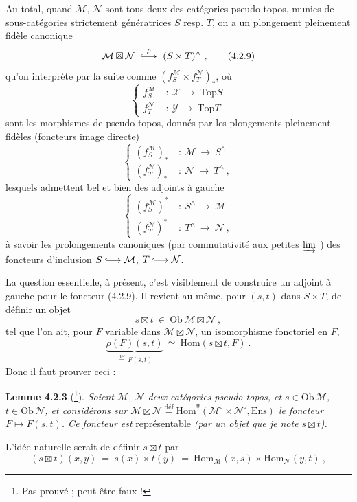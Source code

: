 \documentclass[11pt]{article}
\newcommand{\printedpage}[1]{\marginpar{\footnotesize p.~#1}}
\newcommand{\msp}[1]{\marginpar{\footnotesize [#1]}}
\newcommand{\cM}{\mathcal{M}}
\newcommand{\cN}{\mathcal{N}}
\newcommand{\cX}{\mathcal{X}}
\newcommand{\cY}{\mathcal{Y}}
\newcommand{\uHom}{\underline{\mathrm{Hom}}}
\newcommand{\Hom}{\mathrm{Hom}}
\newcommand{\Ens}{\mathrm{Ens}}
\newcommand{\Top}{\mathrm{Top}}
\newcommand{\Ob}{\mathrm{Ob}\,}
\newcommand{\defeq}{\overset{\text{déf}}{=}}
\newcommand{\bt}{\boxtimes}
\newcommand{\linj}{\lhook\joinrel\longrightarrow}
\begin{document}
Au total, quand $\cM$, $\cN$ sont tous deux des catégories pseudo-topos, munies de sous-catégories strictement génératrices $S$ resp. $T$, on a un plongement pleinement fidèle canonique
\[
\cM\bt\cN \ \overset{\rho}{\linj}\ (S\times T)^{\wedge} \ ,
\tag*{(4.2.9)}
\]
\printedpage{7}
qu'on interprète par la suite comme $(f_{S}^{\cM}\times f_{T}^{\cN})_{*}$, où
\[
\left\{
\begin{aligned}
f_{S}^{\cM} \ &:\ \cX \ \longrightarrow\ \Top S\\
f_{T}^{\cN} \ &:\ \cY \ \longrightarrow\ \Top T
\end{aligned}
\right.
\tag*{(4.2.10)}
\]
sont les morphismes de pseudo-topos, donnés par les plongements pleinement fidèles (foncteurs image directe)
\[
\left\{
\begin{aligned}
(f_{S}^{\cM})_{*} \ &:\ \cM \ \longrightarrow\ S^{\wedge}\\
(f_{T}^{\cN})_{*} \ &:\ \cN \ \longrightarrow\ T^{\wedge} \ ,
\end{aligned}
\right.
\tag*{(4.2.11)}
\]
lesquels admettent bel et bien des adjoints à gauche
\msp{page 63}
\[
\left\{
\begin{aligned}
(f_{S}^{\cM})^{*} \ &:\ S^{\wedge} \ \longrightarrow\ \cM\\
(f_{T}^{\cN})^{*} \ &:\ T^{\wedge} \ \longrightarrow\ \cN \ ,
\end{aligned}
\right.
\tag*{(4.2.12)}
\]
à savoir les prolongements canoniques (par commutativité aux petites $\varinjlim$ ) des foncteurs d'inclusion $S \linj \cM$, $T \linj \cN$.

La question essentielle, à présent, c'est visiblement de construire un adjoint à gauche pour le foncteur (4.2.9). Il revient au même, pour $(s,t)$ dans $S\times T$, de définir un objet
\[
s\bt t \ \in\ \Ob\cM\bt\cN \ ,
\tag*{(4.2.13)}
\]
tel que l'on ait, pour $F$ variable dans $\cM\bt\cN$, un isomorphisme fonctoriel en $F$,
\[
\underbrace{\rho(F)(s,t)}_{\defeq\, F(s,t)} \ \simeq\ \Hom(s\bt t,F) \ .
\]
Donc il faut prouver ceci :

\textbf{Lemme 4.2.3} (\footnote[4]{Pas prouvé ; peut-être faux !}). \textit{Soient $\cM$, $\cN$ deux catégories pseudo-topos, et $s\in\Ob\cM$, $t\in\Ob\cN$, et considérons sur $\cM\bt\cN\defeq\uHom^{!!}(\cM^{\circ}\times\cN^{\circ},\Ens)$ le foncteur $F\longmapsto F(s,t)$. Ce foncteur est} représentable \textit{(par un objet que je note $s\bt t$).}

L'idée naturelle serait de définir $s\bt t$ par
\[
(s\bt t)(x,y) \ =\ s(x)\times t(y) \ =\ \Hom_{\cM}(x,s)\times\Hom_{\cN}(y,t) \ ,
\]
\end{document}
